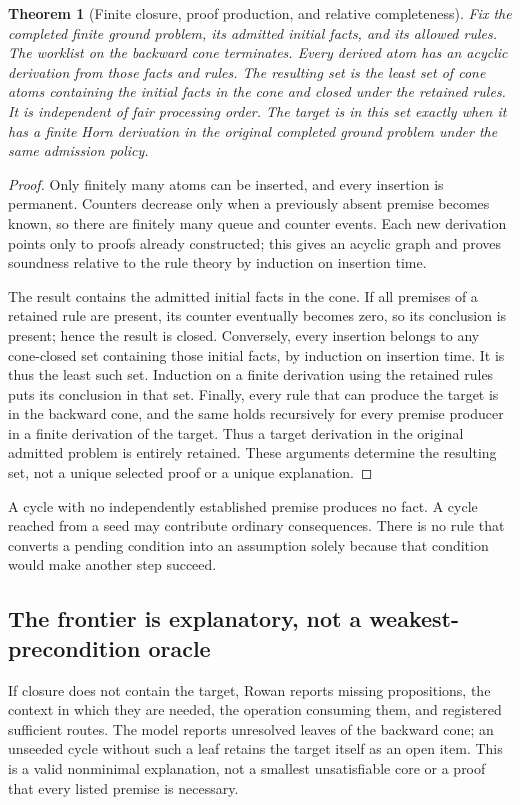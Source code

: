 \documentclass[11pt,letterpaper]{article}
\newtheorem{theorem}{Theorem}[section]
\theoremstyle{definition}\newtheorem{definition}[theorem]{Definition}
\theoremstyle{remark}\newtheorem{remark}[theorem]{Remark}
\begin{document}
\begin{theorem}[Finite closure, proof production, and relative completeness]
Fix the completed finite ground problem, its admitted initial facts, and its
allowed rules. The worklist on the backward cone terminates. Every derived
atom has an acyclic derivation from those facts and rules. The resulting set
is the least set of cone atoms containing the initial facts in the cone and
closed under the retained rules. It is independent of fair processing order.
The target is in this set exactly when it has a finite Horn derivation in the
original completed ground problem under the same admission policy.
\end{theorem}
\begin{proof}
Only finitely many atoms can be inserted, and every insertion is permanent.
Counters decrease only when a previously absent premise becomes known, so
there are finitely many queue and counter events. Each new derivation points
only to proofs already constructed; this gives an acyclic graph and proves
soundness relative to the rule theory by induction on insertion time.

The result contains the admitted initial facts in the cone. If all premises of a retained rule
are present, its counter eventually becomes zero, so its conclusion is
present; hence the result is closed. Conversely, every insertion belongs to
any cone-closed set containing those initial facts, by induction on insertion
time. It is thus the least such set. Induction on a finite derivation using
the retained rules puts its conclusion in that set. Finally, every rule that
can produce the target is in the backward cone, and the same holds recursively
for every premise producer in a finite derivation of the target. Thus a target
derivation in the original admitted problem is entirely retained. These
arguments determine the resulting set, not a unique selected proof or a unique
explanation.
\end{proof}

A cycle with no independently established premise produces no fact. A cycle
reached from a seed may contribute ordinary consequences. There is no rule
that converts a pending condition into an assumption solely because that
condition would make another step succeed.

\subsection{The frontier is explanatory, not a weakest-precondition oracle}
If closure does not contain the target, Rowan reports missing propositions,
the context in which they are needed, the operation consuming them, and
registered sufficient routes. The model reports unresolved leaves of the
backward cone; an unseeded cycle without such a leaf retains the target itself
as an open item. This is a valid nonminimal explanation, not a smallest
unsatisfiable core or a proof that every listed premise is necessary.
\end{document}
